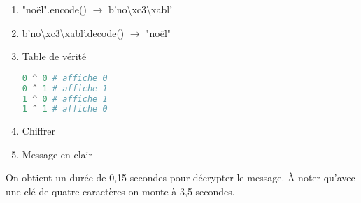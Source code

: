 \documentclass[a4paper,11pt]{article}
\begin{document}
\begin{exo}
\begin{enumerate}
    \item "noël".encode() $\rightarrow$ b'no\textbackslash xc3\textbackslash xabl'
    \item b'no\textbackslash xc3\textbackslash xabl'.decode() $\rightarrow$ "noël"
    \item Table de vérité
    \begin{center}
    \begin{lstlisting}[language=Python]
0 ^ 0 # affiche 0
0 ^ 1 # affiche 1
1 ^ 0 # affiche 1
1 ^ 1 # affiche 0
\end{lstlisting}
    \end{center}
    \item Chiffrer
    
    \item Message en clair
    
\end{enumerate} 
\end{exo}
\begin{exo}
    
    
    
    On obtient un durée de 0,15 secondes pour décrypter le message. À noter qu'avec une clé de quatre caractères on monte à 3,5 secondes.
\end{exo}
\end{document}
